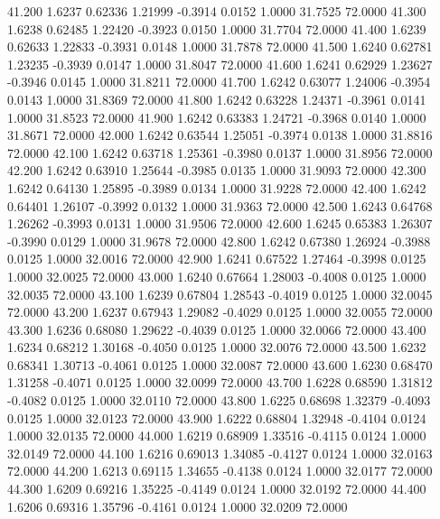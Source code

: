  41.200   1.6237   0.62336   1.21999  -0.3914   0.0152   1.0000  31.7525  72.0000
  41.300   1.6238   0.62485   1.22420  -0.3923   0.0150   1.0000  31.7704  72.0000
  41.400   1.6239   0.62633   1.22833  -0.3931   0.0148   1.0000  31.7878  72.0000
  41.500   1.6240   0.62781   1.23235  -0.3939   0.0147   1.0000  31.8047  72.0000
  41.600   1.6241   0.62929   1.23627  -0.3946   0.0145   1.0000  31.8211  72.0000
  41.700   1.6242   0.63077   1.24006  -0.3954   0.0143   1.0000  31.8369  72.0000
  41.800   1.6242   0.63228   1.24371  -0.3961   0.0141   1.0000  31.8523  72.0000
  41.900   1.6242   0.63383   1.24721  -0.3968   0.0140   1.0000  31.8671  72.0000
  42.000   1.6242   0.63544   1.25051  -0.3974   0.0138   1.0000  31.8816  72.0000
  42.100   1.6242   0.63718   1.25361  -0.3980   0.0137   1.0000  31.8956  72.0000
  42.200   1.6242   0.63910   1.25644  -0.3985   0.0135   1.0000  31.9093  72.0000
  42.300   1.6242   0.64130   1.25895  -0.3989   0.0134   1.0000  31.9228  72.0000
  42.400   1.6242   0.64401   1.26107  -0.3992   0.0132   1.0000  31.9363  72.0000
  42.500   1.6243   0.64768   1.26262  -0.3993   0.0131   1.0000  31.9506  72.0000
  42.600   1.6245   0.65383   1.26307  -0.3990   0.0129   1.0000  31.9678  72.0000
  42.800   1.6242   0.67380   1.26924  -0.3988   0.0125   1.0000  32.0016  72.0000
  42.900   1.6241   0.67522   1.27464  -0.3998   0.0125   1.0000  32.0025  72.0000
  43.000   1.6240   0.67664   1.28003  -0.4008   0.0125   1.0000  32.0035  72.0000
  43.100   1.6239   0.67804   1.28543  -0.4019   0.0125   1.0000  32.0045  72.0000
  43.200   1.6237   0.67943   1.29082  -0.4029   0.0125   1.0000  32.0055  72.0000
  43.300   1.6236   0.68080   1.29622  -0.4039   0.0125   1.0000  32.0066  72.0000
  43.400   1.6234   0.68212   1.30168  -0.4050   0.0125   1.0000  32.0076  72.0000
  43.500   1.6232   0.68341   1.30713  -0.4061   0.0125   1.0000  32.0087  72.0000
  43.600   1.6230   0.68470   1.31258  -0.4071   0.0125   1.0000  32.0099  72.0000
  43.700   1.6228   0.68590   1.31812  -0.4082   0.0125   1.0000  32.0110  72.0000
  43.800   1.6225   0.68698   1.32379  -0.4093   0.0125   1.0000  32.0123  72.0000
  43.900   1.6222   0.68804   1.32948  -0.4104   0.0124   1.0000  32.0135  72.0000
  44.000   1.6219   0.68909   1.33516  -0.4115   0.0124   1.0000  32.0149  72.0000
  44.100   1.6216   0.69013   1.34085  -0.4127   0.0124   1.0000  32.0163  72.0000
  44.200   1.6213   0.69115   1.34655  -0.4138   0.0124   1.0000  32.0177  72.0000
  44.300   1.6209   0.69216   1.35225  -0.4149   0.0124   1.0000  32.0192  72.0000
  44.400   1.6206   0.69316   1.35796  -0.4161   0.0124   1.0000  32.0209  72.0000
